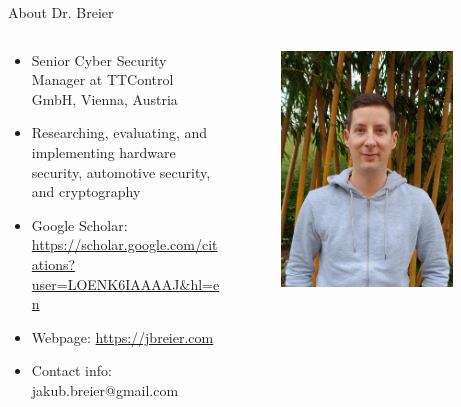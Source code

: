 \documentclass[aspectratio=169]{beamer}
\begin{document}
\begin{frame}{About Dr. Breier}
\begin{columns}[T] 
\begin{column}{.7\textwidth}
    \begin{itemize}
        \item Senior Cyber Security Manager at TTControl GmbH, Vienna, Austria
        \item Researching, evaluating, and implementing hardware security, automotive security, and cryptography
        \item Google Scholar: \url{https://scholar.google.com/citations?user=LOENK6IAAAAJ&hl=en}
        \item Webpage: \url{https://jbreier.com}
        \item Contact info: jakub.breier@gmail.com
    \end{itemize}
\end{column}
\begin{column}{.3\textwidth}
\begin{figure}
    \includegraphics[width=0.9\textwidth]{fig/jakub.jpeg}
\end{figure}
\end{column}
\end{columns}
\end{frame}
\end{document}
